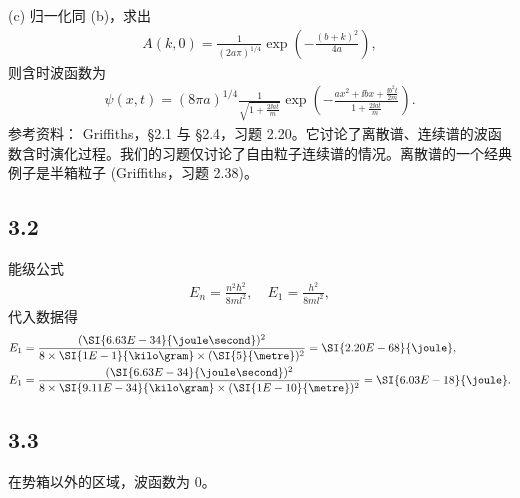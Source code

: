 (c) 归一化同 (b)，求出
\begin{align}
    A(k,0) = \frac1{(2a\pi)^{1/4}} \exp\left(-\frac{(b+k)^2}{4a}\right),
\end{align}
则含时波函数为
\begin{align}
    \psi(x,t) = (8\pi a)^{1/4} \frac1{\sqrt{1 + \frac{2\ii a t}{m}}} \exp\left(
        -\frac{ax^2 + \ii b x + \frac{\ii b^2 t}{2m}}
        {1 + \frac{2\ii a t}{m}}
    \right). 
\end{align}
参考资料：
Griffiths，\S 2.1 与 \S 2.4，习题 2.20。它讨论了离散谱、连续谱的波函数含时演化过程。我们的习题仅讨论了自由粒子连续谱的情况。离散谱的一个经典例子是半箱粒子 (Griffiths，习题 2.38)。

\subsection{3.2}
能级公式
\begin{align}
    E_n = \frac{n^2\hbar^2}{8 m l^2}, \quad E_1 = \frac{h^2}{8ml^2},
\end{align}
代入数据得
\begin{align}
    &E_1 = \frac{(\SI{6.63E-34}{\joule\second})^2}{8\times\SI{1E-1}{\kilo\gram}\times(\SI{5}{\metre})^2} = \SI{2.20E-68}{\joule}, \\
    &E_1 = \frac{(\SI{6.63E-34}{\joule\second})^2}{8\times\SI{9.11E-34}{\kilo\gram}\times(\SI{1E-10}{\metre})^2} = \SI{6.03E-18}{\joule}. 
\end{align}

\subsection{3.3}
在势箱以外的区域，波函数为 0。

